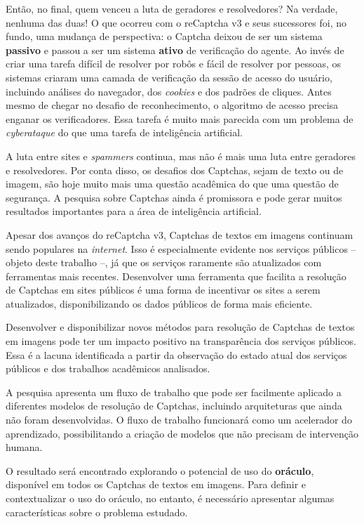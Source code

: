 \documentclass[12pt,twoside,brazilian]{book}
\begin{document}
Então, no final, quem venceu a luta de geradores e resolvedores? Na
verdade, nenhuma das duas! O que ocorreu com o reCaptcha v3 e seus
sucessores foi, no fundo, uma mudança de perspectiva: o Captcha deixou
de ser um sistema \textbf{passivo} e passou a ser um sistema
\textbf{ativo} de verificação do agente. Ao invés de criar uma tarefa
difícil de resolver por robôs e fácil de resolver por pessoas, os
sistemas criaram uma camada de verificação da sessão de acesso do
usuário, incluindo análises do navegador, dos \emph{cookies} e dos
padrões de cliques. Antes mesmo de chegar no desafio de reconhecimento,
o algoritmo de acesso precisa enganar os verificadores. Essa tarefa é
muito mais parecida com um problema de \emph{cyberataque} do que uma
tarefa de inteligência artificial.

A luta entre sites e \emph{spammers} continua, mas não é mais uma luta
entre geradores e resolvedores. Por conta disso, os desafios dos
Captchas, sejam de texto ou de imagem, são hoje muito mais uma questão
acadêmica do que uma questão de segurança. A pesquisa sobre Captchas
ainda é promissora e pode gerar muitos resultados importantes para a
área de inteligência artificial.

Apesar dos avanços do reCaptcha v3, Captchas de textos em imagens
continuam sendo populares na \emph{internet}. Isso é especialmente
evidente nos serviços públicos -- objeto deste trabalho --, já que os
serviços raramente são atualizados com ferramentas mais recentes.
Desenvolver uma ferramenta que facilita a resolução de Captchas em sites
públicos é uma forma de incentivar os sites a serem atualizados,
disponibilizando os dados públicos de forma mais eficiente.

Desenvolver e disponibilizar novos métodos para resolução de Captchas de
textos em imagens pode ter um impacto positivo na transparência dos
serviços públicos. Essa é a lacuna identificada a partir da observação
do estado atual dos serviços públicos e dos trabalhos acadêmicos
analisados.

A pesquisa apresenta um fluxo de trabalho que pode ser facilmente
aplicado a diferentes modelos de resolução de Captchas, incluindo
arquiteturas que ainda não foram desenvolvidas. O fluxo de trabalho
funcionará como um acelerador do aprendizado, possibilitando a criação
de modelos que não precisam de intervenção humana.

O resultado será encontrado explorando o potencial de uso do
\textbf{oráculo}, disponível em todos os Captchas de textos em imagens.
Para definir e contextualizar o uso do oráculo, no entanto, é necessário
apresentar algumas características sobre o problema estudado.
\end{document}

